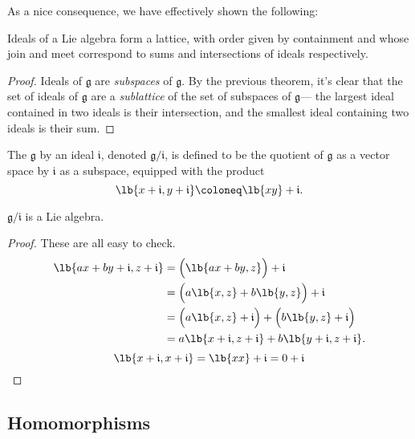 \documentclass{article}
\DeclarePairedDelimiter\lb\lbrack\rbrack
\newcommand*\frkg{{\ensuremath{\mathfrak{g}}}}
\newcommand*\frki{{\ensuremath{\mathfrak{i}}}}
\begin{document}
As a nice consequence, we have effectively shown the following:

\begin{proposition}
    \label{thm:IdealLattice}
    Ideals of a Lie algebra form a lattice, with order given by containment and whose join and meet correspond to sums and intersections of ideals respectively.
\end{proposition}

\begin{proof}
    Ideals of $\frkg$ are \textit{subspaces} of $\frkg$.
    By the previous theorem, it's clear that the set of ideals of $\frkg$ are a \textit{sublattice} of the set of subspaces of $\frkg$--- the largest ideal contained in two ideals is their intersection, and the smallest ideal containing two ideals is their sum.
\end{proof}

\begin{definition}
    The  $\frkg$ by an ideal $\frki$, denoted $\frkg/\frki$, is defined to be the quotient of $\frkg$ as a vector space by $\frki$ as a subspace, equipped with the product
    \[
        \lb{x+\frki,y+\frki}
        \coloneq
        \lb{xy} + \frki.
    \]
\end{definition}

\begin{proposition}
    $\frkg/\frki$ is a Lie algebra.
\end{proposition}
\begin{proof}
    These are all easy to check.
    \begin{align*}
        \lb{ax+by+\frki,z+\frki}
        &=
        \Big(\lb{ax+by,z}\Big) + \frki
        \\\
        &=
        \Big(
            a\lb{x,z}  
            +
            b\lb{y,z}  
        \Big)
        + \frki
        \\
        &=
        \Big(
            a\lb{x,z} + \frki
        \Big)
        +
        \Big(
            b\lb{y,z} + \frki 
        \Big)
        \\
        &=
        a\lb{x+\frki,z+\frki} + b\lb{y+\frki,z+\frki}.
    \end{align*}
    \[
        \lb{x+\frki,x+\frki}
        =
        \lb{xx} + \frki
        =
        0 + \frki
    \]
\end{proof}

\newcommand{\barphi}{\ensuremath{\overline{\phi}}}

\subsection{Homomorphisms}
\end{document}
